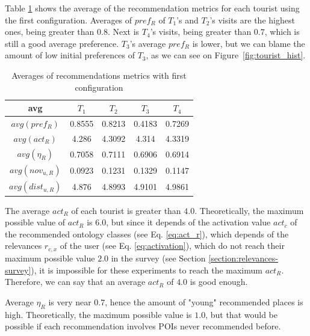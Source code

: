 Table \ref{table:config-1} shows the average of the recommendation metrics for each tourist using the first configuration. Averages of $pref_R$ of $T_1$'s and $T_2$'s visits are the highest ones, being greater than $0.8$.
Next is $T_4$'s visits, being greater than $0.7$, which is still a good average preference. $T_3$'s average $pref_R$ is lower, but we can blame the amount of low initial preferences of $T_3$, as we can see on Figure~\ref{fig:tourist_hist}.

\begin{table}[h!]
\vspace{-0.1cm}
\footnotesize{
    \centering
        \caption{Averages of recommendations metrics with first configuration}
    \label{table:config-1}
    \vspace{-0.3cm}
    \begin{tabular}{ |c|c|c|c|c| } 
        \hline
        avg & $T_1$ & $T_2$ & $T_3$ & $T_4$ \\
        \hline
        \hline
        $avg(pref_R)$ & 0.8555 & 0.8213 & 0.4183 & 0.7269\\
        $avg(act_R)$ & 4.286 & 4.3092 & 4.314 & 4.3319 \\
        $avg(\eta_R)$ & 0.7058 & 0.7111 & 0.6906 & 0.6914 \\
        $avg(nov_{u,R})$ & 0.0923 & 0.1231 & 0.1329 & 0.1147 \\
        $avg(dist_{u,R})$ & 4.876 & 4.8993 & 4.9101 & 4.9861 \\
       
        \hline
    \end{tabular}
    }
    \vspace{-0.2cm}
\end{table}

The average $act_R$ of each tourist is greater than $4.0$. Theoretically, the maximum possible value of $act_R$ is $6.0$, but since it depends of the activation value $act_c$ of the recommended ontology classes (see Eq. \ref{eq:act_r}), which depends of  the relevances $r_{c, x}$ of the user (see Eq. \ref{eq:activation}), which do not reach their maximum possible value $2.0$ in the survey (see Section \ref{section:relevances-survey}), it is impossible for these experiments to reach the maximum $act_R$. Therefore, we can say that an average $act_R$ of $4.0$ is good enough.

Average $\eta_R$ is very near $0.7$, hence the amount of "young" recommended places is high. Theoretically, the maximum possible value is $1.0$, but that would be possible if each recommendation involves POIs never recommended before. 

